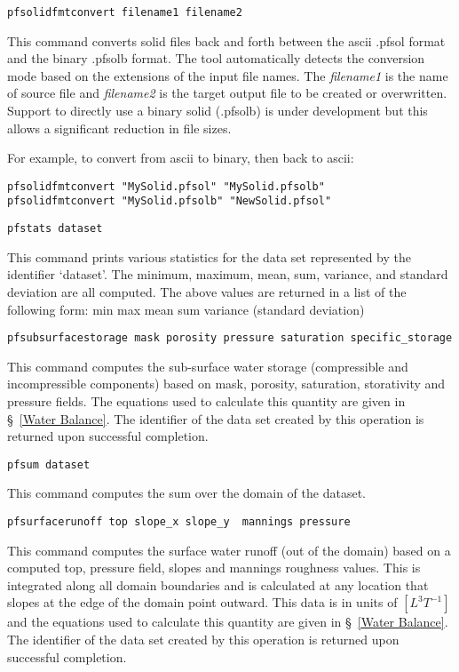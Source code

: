 \begin{description}
\item{\begin{verbatim}pfsolidfmtconvert filename1 filename2 \end{verbatim}}
This command converts solid files back and forth between the ascii .pfsol format and the binary .pfsolb format.
The tool automatically detects the conversion mode based on the extensions of the input file names.
The \textit{filename1} is the name of source file and \textit{filename2} is the target output file to be created or overwritten.
Support to directly use a binary solid (.pfsolb) is under development but this allows a significant reduction in file sizes.

For example, to convert from ascii to binary, then back to ascii:
\begin{display}
\begin{verbatim}
pfsolidfmtconvert "MySolid.pfsol" "MySolid.pfsolb"
pfsolidfmtconvert "MySolid.pfsolb" "NewSolid.pfsol"
\end{verbatim}
\end{display}


\item{\begin{verbatim}pfstats dataset\end{verbatim}}
This command prints various statistics for the data set represented by
the identifier `dataset'.  The minimum, maximum, mean, sum, variance,
and standard deviation are all computed.  The above values are
returned in a list of the following form:
{min max mean sum variance (standard deviation)}


\item{\begin{verbatim}pfsubsurfacestorage mask porosity pressure saturation specific_storage\end{verbatim}}
This command computes the sub-surface water storage (compressible and incompressible components) based on mask, porosity, saturation, storativity and pressure fields. The equations used to calculate this quantity are given in \S~\ref{Water Balance}. The identifier
of the data set created by this operation is returned upon successful
completion.


\item{\begin{verbatim}pfsum dataset\end{verbatim}}
This command computes the sum over the domain of the dataset.


\item{\begin{verbatim}pfsurfacerunoff top slope_x slope_y  mannings pressure\end{verbatim}}
This command computes the surface water runoff (out of the domain) based
on a computed top, pressure field, slopes and mannings roughness values.
This is integrated along all domain boundaries and is calculated at any location
that slopes at the edge of the domain point outward.  This data is in units of $[L^3 T^{-1}]$
and the equations used to calculate this quantity are given in \S~\ref{Water Balance}.
The identifier
of the data set created by this operation is returned upon successful
completion.



\end{description}
